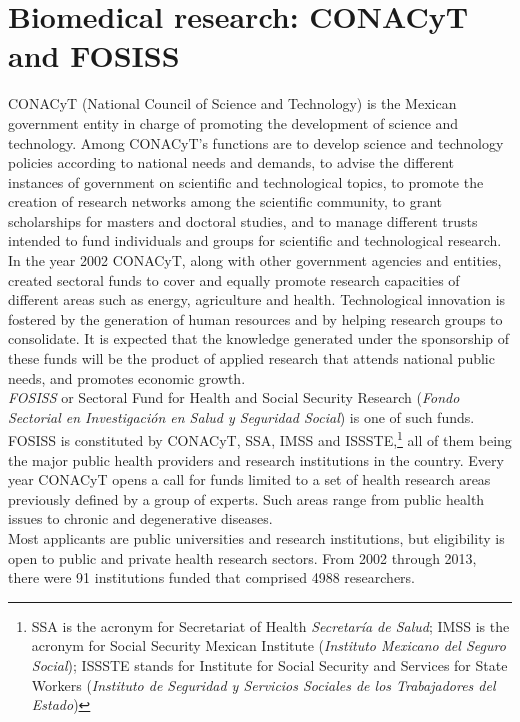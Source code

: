 \documentclass[11pt]{article}
\begin{document}
\section{Biomedical research: CONACyT and FOSISS}
\label{sec:1}

CONACyT (National Council of Science and Technology) is the Mexican government
entity in charge of promoting the development of science and 
technology.
Among CONACyT's functions are to develop science and technology
policies according to national needs and demands, to advise the different
instances of government on scientific and technological topics, to promote the
creation of research networks among the scientific community, to grant
scholarships for masters and doctoral studies, and to manage different trusts 
intended to fund individuals and groups for scientific and
technological research.\\

In the year 2002 CONACyT, along with other government agencies and
entities, created sectoral funds
to cover and equally
promote research capacities of different areas such as energy, agriculture
and health. Technological innovation is fostered by the generation of human resources
and by helping research groups to consolidate. It is expected that the
knowledge generated under the sponsorship of these funds
will be the product of applied research that attends national public
needs, and promotes economic growth.\\

\emph{FOSISS} or Sectoral Fund for Health and Social Security Research
(\emph{Fondo Sectorial en Investigaci\'on en Salud y Seguridad Social}) is one of
such funds. FOSISS is constituted by CONACyT, SSA, IMSS and ISSSTE,\footnote{SSA
  is the acronym for Secretariat of Health \emph{Secretar\'ia de Salud}; IMSS is
  the acronym for Social Security Mexican Institute (\emph{Instituto Mexicano
    del Seguro Social}); ISSSTE stands for Institute for Social Security and
  Services for State Workers (\emph{Instituto de Seguridad y Servicios Sociales
    de los Trabajadores del Estado})} all of them being the major public health
providers and research institutions in the country. Every year CONACyT opens a
call for funds limited to a set of health research areas previously defined by a
group of experts. Such areas range from public health issues to chronic and
degenerative diseases.\\  

Most applicants are public universities and research institutions, but
eligibility is open to public and private health research sectors.
From 2002 through 2013, there were 91 institutions funded that
comprised 4988 researchers.\\
\end{document}
